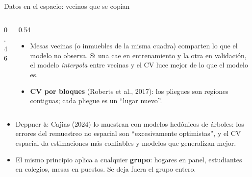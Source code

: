 \documentclass{beamer}
\newcommand{\1}{\mathbb{I}}
\begin{document}
\begin{frame}{Datos en el espacio: vecinos que se copian}
\small
\begin{columns}[T]
\begin{column}{0.46\textwidth}
\begin{center}
\end{center}
\end{column}
\begin{column}{0.54\textwidth}
\vspace{0.05cm}
\begin{itemize}\itemsep3pt
  \item Mesas vecinas (o inmuebles de la misma cuadra) comparten lo que el modelo no observa. Si una cae en entrenamiento y la otra en validación, el modelo \emph{interpola} entre vecinas y el CV luce mejor de lo que el modelo es.
  \item \textbf{CV por bloques} (Roberts et al., 2017): los pliegues son regiones contiguas; cada pliegue es un ``lugar nuevo''.
\end{itemize}
\end{column}
\end{columns}
\pause
\vspace{0.1cm}
\begin{itemize}\itemsep3pt
  \item Deppner \& Cajias (2024) lo muestran con modelos hedónicos de árboles: los errores del remuestreo no espacial son ``excesivamente optimistas'', y el CV espacial da estimaciones más confiables y modelos que generalizan mejor.
  \item El mismo principio aplica a cualquier \textbf{grupo}: hogares en panel, estudiantes en colegios, mesas en puestos. Se deja fuera el grupo entero.
\end{itemize}
\end{frame}
\end{document}
